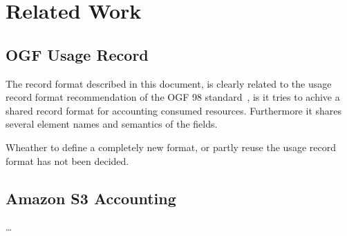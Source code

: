 \section{Related Work}


\subsection{OGF Usage Record}

The record format described in this document, is clearly related to the usage
record format recommendation of the OGF 98 standard~\cite{ogf98ur}, is it tries
to achive a shared record format for accounting consumed resources. Furthermore
it shares several element names and semantics of the fields.

Wheather to define a completely new format, or partly reuse the usage record
format has not been decided.


\subsection{Amazon S3 Accounting}

\ldots

